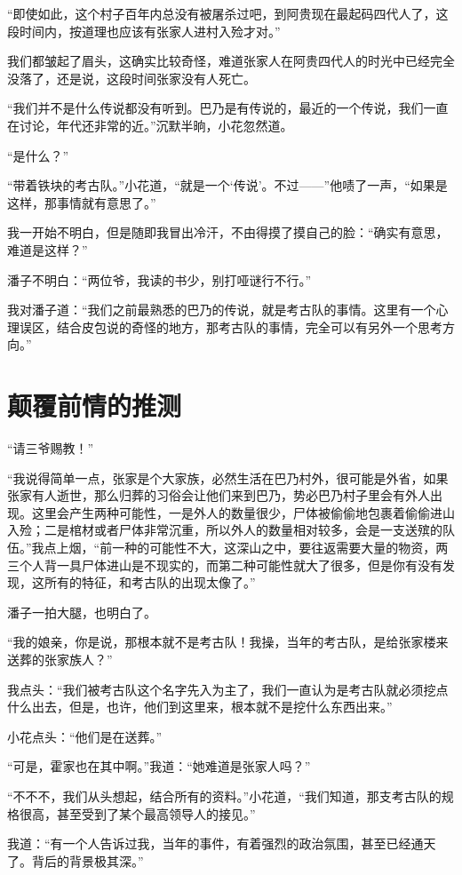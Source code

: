 “即使如此，这个村子百年内总没有被屠杀过吧，到阿贵现在最起码四代人了，这段时间内，按道理也应该有张家人进村入殓才对。”

我们都皱起了眉头，这确实比较奇怪，难道张家人在阿贵四代人的时光中已经完全没落了，还是说，这段时间张家没有人死亡。

“我们并不是什么传说都没有听到。巴乃是有传说的，最近的一个传说，我们一直在讨论，年代还非常的近。”沉默半晌，小花忽然道。

“是什么？”

“带着铁块的考古队。”小花道，“就是一个‘传说’。不过——”他啧了一声，“如果是这样，那事情就有意思了。”

我一开始不明白，但是随即我冒出冷汗，不由得摸了摸自己的脸：“确实有意思，难道是这样？”

潘子不明白：“两位爷，我读的书少，别打哑谜行不行。”

我对潘子道：“我们之前最熟悉的巴乃的传说，就是考古队的事情。这里有一个心理误区，结合皮包说的奇怪的地方，那考古队的事情，完全可以有另外一个思考方向。”

\chapter{颠覆前情的推测}

“请三爷赐教！”

“我说得简单一点，张家是个大家族，必然生活在巴乃村外，很可能是外省，如果张家有人逝世，那么归葬的习俗会让他们来到巴乃，势必巴乃村子里会有外人出现。这里会产生两种可能性，一是外人的数量很少，尸体被偷偷地包裹着偷偷进山入殓；二是棺材或者尸体非常沉重，所以外人的数量相对较多，会是一支送殡的队伍。”我点上烟，“前一种的可能性不大，这深山之中，要往返需要大量的物资，两三个人背一具尸体进山是不现实的，而第二种可能性就大了很多，但是你有没有发现，这所有的特征，和考古队的出现太像了。”

潘子一拍大腿，也明白了。

“我的娘亲，你是说，那根本就不是考古队！我操，当年的考古队，是给张家楼来送葬的张家族人？”

我点头：“我们被考古队这个名字先入为主了，我们一直认为是考古队就必须挖点什么出去，但是，也许，他们到这里来，根本就不是挖什么东西出来。”

小花点头：“他们是在送葬。”

“可是，霍家也在其中啊。”我道：“她难道是张家人吗？”

“不不不，我们从头想起，结合所有的资料。”小花道，“我们知道，那支考古队的规格很高，甚至受到了某个最高领导人的接见。”

我道：“有一个人告诉过我，当年的事件，有着强烈的政治氛围，甚至已经通天了。背后的背景极其深。”

